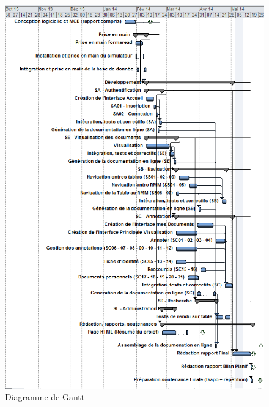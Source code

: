 \documentclass[a4paper]{article}
\begin{document}
\begin{figure}[H]
\centering
\includegraphics[width=\textwidth]{gantt.png}
\caption{Diagramme de Gantt}
\label{fig:gantt}
\end{figure}
\end{document}
